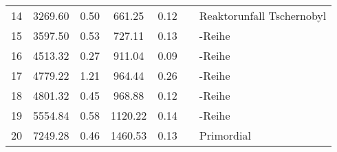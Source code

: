 \begin{tabular}{cSSSSll}
14 & 3269.60     & 0.50   & 661.25        & 0.12   & \cs{}             & Reaktorunfall Tschernobyl\\
15 & 3597.50     & 0.53   & 727.11        & 0.13   &  & -Reihe  \\
16 & 4513.32     & 0.27   & 911.04        & 0.09   &  & -Reihe  \\
17 & 4779.22     & 1.21   & 964.44        & 0.26   &  & -Reihe  \\
18 & 4801.32     & 0.45   & 968.88        & 0.12   &  & -Reihe  \\
19 & 5554.84     & 0.58   & 1120.22       & 0.14   &  & -Reihe   \\
20 & 7249.28     & 0.46   & 1460.53       & 0.13   &    & Primordial           \\ \bottomrule
\end{tabular}
